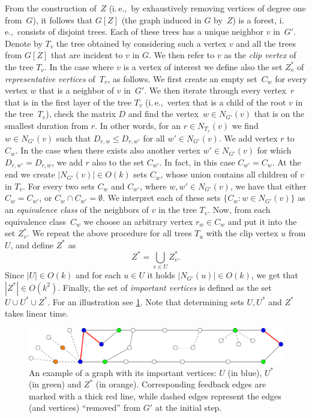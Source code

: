 \documentclass[a4paper,UKenglish,cleveref, autoref, thm-restate]{lipics-v2021}
\newcommand{\ie}{i.\,e.,\ }
\begin{document}
From the construction of~$Z$ (\ie by exhaustively removing vertices of degree one from~$G$), it follows that $G[Z]$ (the graph induced in $G$ by~$Z$) is a forest, \ie consists of disjoint trees. 
Each of these trees has a unique neighbor $v$ in~$G'$. 
Denote by $T_v$ the tree obtained by considering such a vertex $v$ and all the trees from $G[Z]$ that are incident to $v$ in $G$. 
We then refer to $v$ as the \emph{clip vertex} of the tree $T_v$.
In the case where $v$ is a vertex of interest we define also the set $Z^*_v$ of \emph{representative vertices} of~$T_v$, as follows.
%
We first create an empty set~$C_w$ for every vertex $w$ that is a neighbor of $v$ in~$G'$.
We then iterate through every vertex~$r$ that is in the first layer of the tree $T_v$ (\ie vertex that is a child of the root $v$ in the tree~$T_v$), check the matrix $D$ and find the vertex~$w \in N_{G'}(v)$ that is on the smallest duration from $r$.
In other words, for an $r \in N_{T_v}(v)$ we find $w \in N_{G'}(v)$ such that $D_{r,w} \leq D_{r,w'}$ for all $w' \in  N_{G'}(v)$.
%
We add vertex $r$ to $C_w$.
In the case when there exists also another vertex $w' \in  N_{G'}(v) $ for which $D_{r,w'} = D_{r,w}$, we add $r$ also to the set $C_{w'}$. In fact, in this case $C_{w'} = C_w$.
At the end we create $|N_{G'}(v)| \in O(k)$ sets $C_w$, whose union contains all children of $v$ in $T_v$. 
For every two sets $C_w$ and $C_{w'}$, where $w,w'\in N_{G'}(v)$, we have that either $C_w = C_{w'}$, or $C_w \cap C_{w'} = \emptyset$. 
We interpret each of these sets $\{C_w : w \in N_{G'}(v)\}$ as an \emph{equivalence class} of the neighbors of $v$ in the tree $T_v$. 
Now, from each equivalence class~$C_w$ we choose an arbitrary vertex $r_w \in C_w$ and put it into the set $Z^*_v$.
%
We repeat the above procedure for all trees $T_u$ with the clip vertex $u$ from $U$, and define $Z^*$ as  
\begin{equation}
    Z^* = \bigcup\limits_{v \in U} Z^*_v.
\end{equation}
%
Since $|U| \in O(k)$ and for each $u \in U$ it holds $|N_{G'}(u)| \in O(k)$, we get that $|Z^*| \in O(k^2)$. 
Finally, the set of \emph{important vertices} is defined as the set $U \cup U^{\ast} \cup Z^{\ast}$.
For an illustration see \cref{fig:labelingVertices}. Note that determining sets $U, U^*$ and $Z^*$ takes linear time.

\begin{figure}[t]
	\centering
	\includegraphics[width=0.8\columnwidth]{fig-example-names-vertices_new}
	\caption{An example of a graph with its important vertices: $U$ (in blue), $U^*$ (in green) and $Z^*$ (in orange).
    Corresponding feedback edges are marked with a thick red line, while dashed edges represent the edges (and vertices) ``removed'' from $G'$ at the initial step.
	\label{fig:labelingVertices}}
\end{figure}
\end{document}
